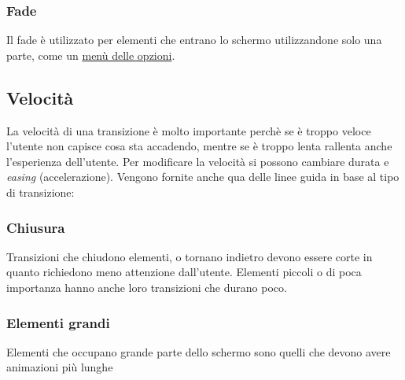 \documentclass[12pt, a4paper]{report}
\begin{document}
		\subsubsection{Fade}
			Il fade è utilizzato per elementi che entrano lo schermo utilizzandone solo una parte, come un \href{https://kstatic.googleusercontent.com/files/4bf2ddbf50d779f37d88f276b831fad1aad78a23379a87d2b715dbb90d878897d1ad5edcf03385e1814d2ec3f4e9f152fd736ab2727d7f0e0d8b58467eb41057}{menù delle opzioni}.
	\subsection{Velocità}
		La velocità di una transizione è molto importante perchè se è troppo veloce l'utente non capisce cosa sta accadendo, mentre se è troppo lenta rallenta anche l'esperienza dell'utente.
		Per modificare la velocità si possono cambiare durata e \textit{easing} (accelerazione). Vengono fornite anche qua delle linee guida in base al tipo di transizione:
		\subsubsection{Chiusura}
		Transizioni che chiudono elementi, o tornano indietro devono essere corte in quanto richiedono meno attenzione dall'utente.
		Elementi piccoli o di poca importanza hanno anche loro transizioni che durano poco.
		\subsubsection{Elementi grandi}
		Elementi che occupano grande parte dello schermo sono quelli che devono avere animazioni più lunghe
\end{document}
